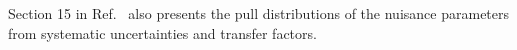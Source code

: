 %
%


Section 15 in Ref.~\cite{alphaTnote} also presents the pull distributions of the nuisance parameters from systematic uncertainties and transfer factors.
